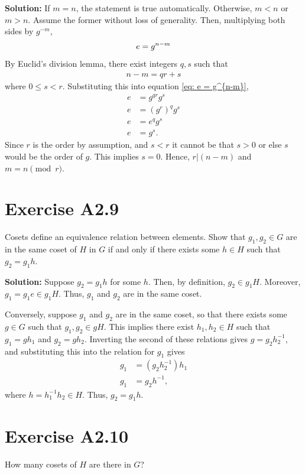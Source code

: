 \documentclass{book}
\begin{document}
    \textbf{Solution:} If $m=n$, the statement is true automatically. Otherwise, $m<n$ or $m>n$. Assume the former without loss of generality. Then, multiplying both sides by $g^{-m}$,
    \begin{align} \label{eq: e = g^{n-m}}
        e = g^{n-m}
    \end{align}
    By Euclid's division lemma, there exist integers $q, s$ such that
    \begin{align}
        n-m = qr + s
    \end{align}
    where $0\leq s < r$. Substituting this into equation \eqref{eq: e = g^{n-m}},
    \begin{align}
        e &= g^{qr}g^s \\
        e &= (g^r)^q g^s \\
        e &= e^q g^s \\
        e &= g^s.
    \end{align}
    Since $r$ is the order by assumption, and $s <r$ it cannot be that $s>0$ or else $s$ would be the order of $g$. This implies $s=0$. Hence, $r|(n-m)$ and $m = n \pmod r$.

\section*{Exercise A2.9}
    Cosets define an equivalence relation between elements. Show that $g_1, g_2 \in G$ are in the same coset of $H$ in $G$ if and only if there exists some $h\in H$ such that $g_2 = g_1 h$.
    
    \textbf{Solution:} Suppose $g_2 = g_1 h$ for some $h$. Then, by definition, $g_2 \in g_1 H$. Moreover, $g_1 = g_1 e \in g_1 H$. Thus, $g_1$ and $g_2$ are in the same coset.
    
    Conversely, suppose $g_1$ and $g_2$ are in the same coset, so that there exists some $g\in G$ such that $g_1, g_2 \in gH$. This implies there exist $h_1, h_2 \in H$ such that $g_1 = g h_1$ and $g_2 = g h_2$. Inverting the second of these relations gives $g = g_2 h_2^{-1}$, and substituting this into the relation for $g_1$ gives
    \begin{align}
        g_1 &= (g_2 h_2^{-1})h_1 \\
        g_1 &= g_2 h^{-1},
    \end{align}
    where $h = h_1^{-1}h_2\in H$. Thus, $g_2 = g_1 h$.
    
\section*{Exercise A2.10}
    How many cosets of $H$ are there in $G$?
    
\end{document}

